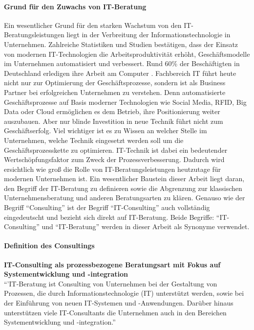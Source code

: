	\paragraph*{Grund für den Zuwachs von IT-Beratung}
		Ein wesentlicher Grund für den starken Wachstum von den IT-Beratungsleistungen liegt in der Verbreitung der Informationstechnologie in Unternehmen. Zahlreiche Statistiken und Studien bestätigen, dass der Einsatz von modernen IT-Technologien die Arbeitsproduktivität erhöht, Geschäftsmodelle im Unternehmen automatisiert und verbessert. Rund 60\% der Beschäftigten in Deutschland  erledigen ihre Arbeit am Computer \cite{IreneBertschek.2011}.
		Fachbereich IT führt heute nicht nur zur Optimierung der Geschäftsprozesse, sondern ist als Business Partner bei erfolgreichen Unternehmen zu verstehen. Denn automatisierte Geschäftsprozesse auf Basis moderner Technologien wie Social Media, RFID, Big Data oder Cloud  ermöglichen es dem Betrieb, ihre Positionierung weiter auszubauen.
		Aber nur blinde Investition in neue Technik führt nicht zum Geschäftserfolg. Viel wichtiger ist es zu Wissen an welcher Stelle im Unternehmen, welche Technik eingesetzt werden soll um die Geschäftsprozesskette zu optimieren. IT-Technik ist dabei ein bedeutender Wertschöpfungsfaktor zum Zweck der Prozessverbesserung.
		Dadurch wird ersichtlich wie groß die Rolle von IT-Beratungsleistungen heutzutage  für modernen Unternehmen ist. Ein wesentlicher Baustein dieser Arbeit liegt daran, den Begriff der IT-Beratung  zu definieren sowie die Abgrenzung zur klassischen Unternehmensberatung und anderen Beratungsarten  zu klären.
		Genauso wie der Begriff “Consulting” ist der Begriff “IT-Consulting” auch vollständig eingedeutscht und bezieht sich direkt auf IT-Beratung. Beide Begriffe: “IT-Consulting” und “IT-Beratung” werden in dieser Arbeit als Synonyme verwendet.\\
		\paragraph*{Definition des Consultings}
		\textbf{IT-Consulting als prozessbezogene Beratungsart mit Fokus auf Systementwicklung und -integration}\\
			``'IT-Beratung ist Consulting von Unternehmen bei der Gestaltung von Prozessen, die durch Informationstechnologie (IT) unterstützt werden, sowie bei der Einführung von neuen IT-Systemen und -Anwendungen. Darüber hinaus unterstützen viele IT-Consultants die Unternehmen auch in den Bereichen Systementwicklung und -integration.'' \cite[208]{ReinekeBock200709}\\
			
